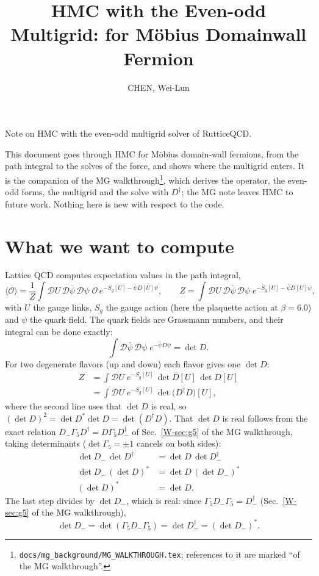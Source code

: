 \documentclass[11pt,a4paper]{article}
\title{\textsf{\bfseries HMC with the Even-odd Multigrid: for M\"obius Domainwall Fermion}}
\author{CHEN, Wei-Lun}
\date{}
\numberwithin{equation}{section}
\newcommand{\dg}{^{\dagger}}
\newcommand{\Gfive}{\Gamma_5}
\newcommand{\code}[1]{\texttt{\small #1}}
\begin{document}
\maketitle

Note on HMC with the even-odd multigrid solver of RutticeQCD.


This document goes through HMC for M\"obius domain-wall fermions, from the path integral to the
solves of the force, and shows where the multigrid enters. It is the companion of the MG
walkthrough\footnote{\code{docs/mg\_background/MG\_WALKTHROUGH.tex}; references to it are marked
``of the MG walkthrough''.}, which derives the operator, the even-odd forms, the multigrid and the
solve with $D\dg$; the MG note leaves HMC to future work. Nothing here is new with respect to the
code.

\tableofcontents


\section{What we want to compute}
Lattice QCD computes expectation values in the path integral,
\begin{equation}
\langle\mathcal O\rangle=\frac1Z\int\mathcal DU\,\mathcal D\bar\psi\,\mathcal D\psi\;
\mathcal O\,e^{-S_g[U]-\bar\psi D[U]\psi},\qquad
Z=\int\mathcal DU\,\mathcal D\bar\psi\,\mathcal D\psi\;e^{-S_g[U]-\bar\psi D[U]\psi},
\end{equation}
with $U$ the gauge links, $S_g$ the gauge action (here the plaquette action at $\beta=6.0$) and
$\psi$ the quark field. The quark fields are Grassmann numbers, and their integral can be done
exactly:
\begin{equation}
\int\mathcal D\bar\psi\,\mathcal D\psi\;e^{-\bar\psi D\psi}=\det D .
\end{equation}
For two degenerate flavors (up and down) each flavor gives one $\det D$:
\begin{align}
Z&=\int\mathcal DU\;e^{-S_g[U]}\,\det D[U]\,\det D[U]\nonumber\\
&=\int\mathcal DU\;e^{-S_g[U]}\,\det\!\big(D\dg D\big)[U],
\end{align}
where the second line uses that $\det D$ is real, so $(\det D)^2=\det D^*\det D=\det(D\dg D)$.
That $\det D$ is real follows from the exact relation $D_-\Gfive D\dg=D\Gfive D_-\dg$ of
Sec.~\ref{W-sec:g5} of the MG walkthrough, taking determinants ($\det\Gfive=\pm1$ cancels on both sides):
\begin{align}
\det D_-\,\det D\dg&=\det D\,\det D_-\dg\nonumber\\
\det D_-\,(\det D)^*&=\det D\,(\det D_-)^*\nonumber\\
(\det D)^*&=\det D .
\end{align}
The last step divides by $\det D_-$, which is real: since $\Gfive D_-\Gfive=D_-\dg$
(Sec.~\ref{W-sec:g5} of the MG walkthrough),
\begin{equation}
\det D_-=\det(\Gfive D_-\Gfive)=\det D_-\dg=(\det D_-)^* .
\end{equation}
\end{document}
